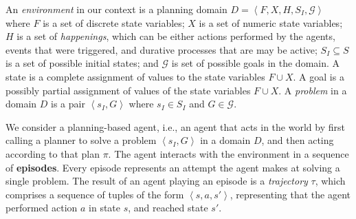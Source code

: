 \documentclass[letterpaper]{article} %
\newcommand{\tuple}[1]{\ensuremath{\left \langle #1 \right \rangle }} %
\begin{document}
An \emph{environment} in our context is a planning domain $D=\tuple{F, X, H, S_I, \mathcal{G}}$ where 
$F$ is a set of discrete state variables;  
$X$ is a set of numeric state variables; 
$H$ is a set of \emph{happenings}, which can be either actions performed by the agents, events that were triggered, and durative processes that are may be active; 
$S_I\subseteq S$ is a set of possible initial states;
and  $\mathcal{G}$ is set of possible goals in the domain. 
A state is a complete assignment of values to the state variables $F\cup X$.
A goal is a possibly partial assignment of values of the state variables $F\cup X$. 
A \emph{problem} in a domain $D$ is a pair $\tuple{s_I, G}$ where $s_I\in S_I$ and $G\in \mathcal{G}$.


We consider a planning-based agent, i.e., an agent that acts in the world by first calling a planner to solve a problem $\tuple{s_I, G}$ in a domain $D$, and then acting according to that plan $\pi$. 
The agent interacts with the environment in a sequence of \textbf{episodes}. 
Every episode represents an attempt the agent makes at solving a single problem. 
The result of an agent playing an episode is a \emph{trajectory} $\tau$, which comprises a sequence of tuples of the form $\tuple{s, a, s'}$, representing that the agent performed action $a$ in state $s$, and reached state $s'$. 

\end{document}
